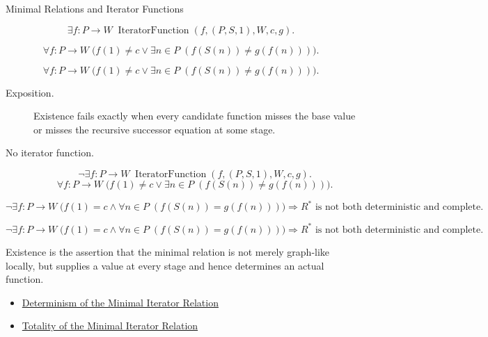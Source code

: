 \begin{topicbox}{Minimal Relations and Iterator Functions}
\begin{remark*}
\[
\exists f:P\to W\;
\operatorname{IteratorFunction}(f,(P,S,1),W,c,g).
\]
\end{remark*}

\begin{remark*}
\[
\forall f:P\to W\;
\bigl(f(1)\neq c\lor \exists n\in P\;(f(S(n))\neq g(f(n)))\bigr).
\]
\end{remark*}

\begin{remark*}
\[
\forall f:P\to W\;
\bigl(f(1)\neq c\lor \exists n\in P\;(f(S(n))\neq g(f(n)))\bigr).
\]
\end{remark*}

\begin{remark*}
\begin{description}
  \item[Exposition.]
  Existence fails exactly when every candidate function misses the base value
  or misses the recursive successor equation at some stage.
  \item[No iterator function.]
  \[
  \neg\exists f:P\to W\;
  \operatorname{IteratorFunction}(f,(P,S,1),W,c,g).
  \]
  \[
  \forall f:P\to W\;
  \bigl(f(1)\neq c\lor \exists n\in P\;(f(S(n))\neq g(f(n)))\bigr).
  \]
\end{description}
\end{remark*}

\begin{remark*}
\[
\neg\exists f:P\to W\;
\bigl(f(1)=c\land \forall n\in P\;(f(S(n))=g(f(n)))\bigr)
\Longrightarrow
R^* \text{ is not both deterministic and complete}.
\]
\end{remark*}

\begin{remark*}
\[
\neg\exists f:P\to W\;
\bigl(f(1)=c\land \forall n\in P\;(f(S(n))=g(f(n)))\bigr)
\Longrightarrow
R^* \text{ is not both deterministic and complete}.
\]
\end{remark*}

\begin{remark*}[Interpretation]
Existence is the assertion that the minimal relation is not merely graph-like
locally, but supplies a value at every stage and hence determines an actual
function.
\end{remark*}

\begin{dependencies}
\begin{itemize}
  \item \hyperref[lem:minimal-iterator-relation-deterministic]{Determinism of the Minimal Iterator Relation}
  \item \hyperref[lem:minimal-iterator-relation-complete]{Totality of the Minimal Iterator Relation}
\end{itemize}
\end{dependencies}


\end{topicbox}
